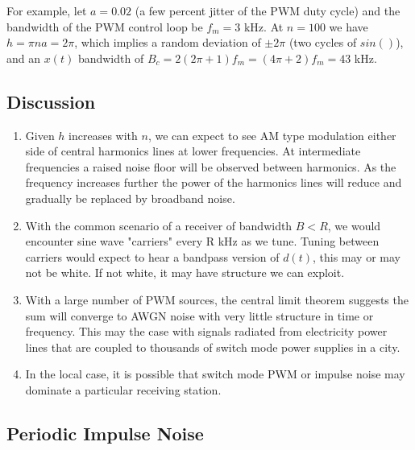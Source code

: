 \documentclass{article}
\begin{document}
For example, let $a=0.02$ (a few percent jitter of the PWM duty cycle) and the bandwidth of the PWM control loop be $f_m=3$ kHz. At $n=100$ we have $h=\pi n a = 2\pi$, which implies a random deviation of $\pm 2\pi$ (two cycles of $sin()$), and an $x(t)$ bandwidth of $B_c=2(2 \pi+1)f_m = (4\pi+2)f_m = 43$ kHz.

\subsection{Discussion}

\begin{enumerate}
\item Given $h$ increases with $n$, we can expect to see AM type modulation either side of central harmonics lines at lower frequencies.  At intermediate frequencies a raised noise floor will be observed between harmonics.  As the frequency increases further the power of the harmonics lines will reduce and gradually be replaced by broadband noise.
\item With the common scenario of a receiver of bandwidth $B<R$, we would encounter sine wave "carriers" every R kHz as we tune.  Tuning between carriers would expect to hear a bandpass version of $d(t)$, this may or may not be white.  If not white, it may have structure we can exploit.
\item With a large number of PWM sources, the central limit theorem suggests the sum will converge to AWGN noise with very little structure in time or frequency.  This may the case with signals radiated from electricity power lines that are coupled to thousands of switch mode power supplies in a city.
\item In the local case, it is possible that switch mode PWM or impulse noise may dominate a particular receiving station.
\end{enumerate}

\subsection{Periodic Impulse Noise}
\end{document}
